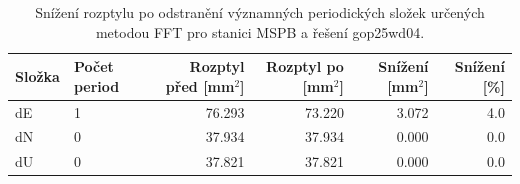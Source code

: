\begin{table}[htbp]
\caption{Snížení rozptylu po odstranění významných periodických složek určených metodou FFT pro stanici MSPB a řešení gop25wd04.}
\label{tab:gop25wd04_stcd_mspb_detr_weighted_1seg_spectral_fft_variance_reduction}
\begin{tabular}{llrrrr}
\toprule
Složka & Počet period & Rozptyl před [mm$^2$] & Rozptyl po [mm$^2$] & Snížení [mm$^2$] & Snížení [\%] \\
\midrule
dE & 1 & 76.293 & 73.220 & 3.072 & 4.0 \\
dN & 0 & 37.934 & 37.934 & 0.000 & 0.0 \\
dU & 0 & 37.821 & 37.821 & 0.000 & 0.0 \\
\bottomrule
\end{tabular}
\end{table}
